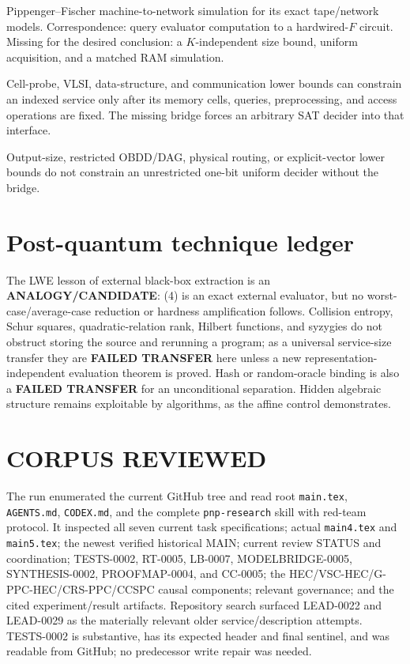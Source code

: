 \documentclass[11pt]{article}
\newcommand{\status}[1]{\textbf{#1}}
\begin{document}
\begin{description}[leftmargin=3.2cm,style=nextline]
\item[THEOREM TRANSFER.] Pippenger--Fischer machine-to-network simulation for
its exact tape/network models.  Correspondence: query evaluator computation
to a hardwired-$F$ circuit.  Missing for the desired conclusion: a
$K$-independent size bound, uniform acquisition, and a matched RAM simulation.
\item[ANALOGY / CANDIDATE.] Cell-probe, VLSI, data-structure, and communication
lower bounds can constrain an indexed service only after its memory cells,
queries, preprocessing, and access operations are fixed.  The missing bridge
forces an arbitrary SAT decider into that interface.
\item[FAILED TRANSFER.] Output-size, restricted OBDD/DAG, physical routing,
or explicit-vector lower bounds do not constrain an unrestricted one-bit
uniform decider without the bridge.
\end{description}

\section{Post-quantum technique ledger}
The LWE lesson of external black-box extraction is an
\status{ANALOGY/CANDIDATE}: (4) is an exact external evaluator, but no
worst-case/average-case reduction or hardness amplification follows.
Collision entropy, Schur squares, quadratic-relation rank, Hilbert functions,
and syzygies do not obstruct storing the source and rerunning a program; as a
universal service-size transfer they are \status{FAILED TRANSFER} here unless
a new representation-independent evaluation theorem is proved.  Hash or
random-oracle binding is also a \status{FAILED TRANSFER} for an unconditional
separation.  Hidden algebraic structure remains exploitable by algorithms,
as the affine control demonstrates.

\section{CORPUS REVIEWED}
The run enumerated the current GitHub tree and read root \texttt{main.tex},
\texttt{AGENTS.md}, \texttt{CODEX.md}, and the complete
\texttt{pnp-research} skill with red-team protocol.  It inspected all seven
current task specifications; actual \texttt{main4.tex} and \texttt{main5.tex};
the newest verified historical MAIN; current review STATUS and coordination;
TESTS-0002, RT-0005, LB-0007, MODELBRIDGE-0005, SYNTHESIS-0002, PROOFMAP-0004,
and CC-0005; the HEC/VSC-HEC/G-PPC-HEC/CRS-PPC/CCSPC causal components;
relevant governance; and the cited experiment/result artifacts.  Repository
search surfaced LEAD-0022 and LEAD-0029 as the materially relevant older
service/description attempts.  TESTS-0002 is substantive, has its expected
header and final sentinel, and was readable from GitHub; no predecessor write
repair was needed.
\end{document}
